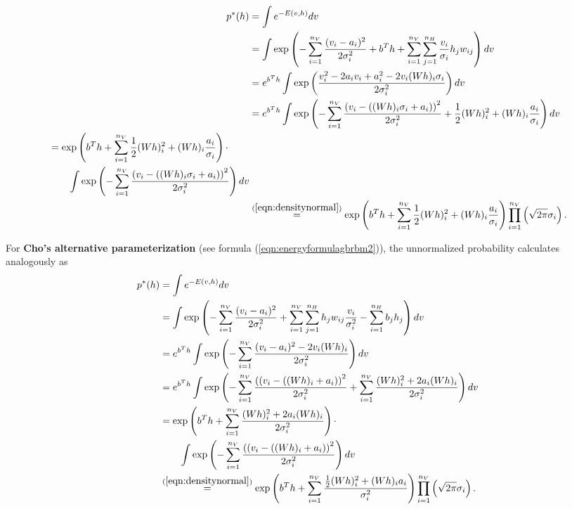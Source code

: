 \documentclass[12pt]{article}
\begin{document}
\begin{align*}
   p^*(h) &= \int e^{-E \left(v,h \right)} dv \\
   &= \int \exp \left( -\sum_{i=1}^{n_V}\frac{(v_i - a_i)^2}{2\sigma_i^2} + b^T h + \sum_{i=1}^{n_V} \sum_{j=1}^{n_H} \frac{v_i}{\sigma_i}h_j w_{ij} \right) dv\\
   &= e^{b^T h} \int \exp \left( \frac{v_i^2 -2 a_i v_i + a_i^2 - 2 v_i (Wh)_i \sigma_i}{2 \sigma_i^2} \right) dv \\
   &= e^{b^T h} \int \exp \left(
      - \sum_{i=1}^{n_V} \frac{{\left( v_i - \left( (Wh)_i \sigma_i + a_i \right) \right)}^2}{2\sigma_i^2} + \frac{1}{2}(Wh)_i^2 + (Wh)_i \frac{a_i}{\sigma_i} \right ) dv \\
   \begin{split}
      &= \exp \left(b^T h + \sum_{i=1}^{n_V} \frac{1}{2}(Wh)_i^2 + (Wh)_i \frac{a_i}{\sigma_i} \right ) \cdot \\
      & \quad \quad \int \exp \left ( - \sum_{i=1}^{n_V} \frac{{\left( v_i - ((Wh)_i \sigma_i + a_i) \right)}^2}{2\sigma_i^2} \right) dv
   \end{split} \\
   & \stackrel{(\ref{eqn:densitynormal})}{=} \exp \left( b^T h + \sum_{i=1}^{n_V} \frac{1}{2}(Wh)_i^2 + (Wh)_i \frac{a_i}{\sigma_i} \right ) \prod_{i=1}^{n_V}\left(\sqrt{2\pi} \sigma_i\right). \\
\end{align*}

For {\bf Cho's alternative parameterization} (see formula (\ref{eqn:energyformulagbrbm2})), the unnormalized probability calculates analogously as
\begin{align*}
   p^*(h) &= \int e^{-E \left(v,h \right)} dv \\
   &= \int \exp \left( - \sum_{i=1}^{n_V} \frac{(v_i - a_i)^2}{2\sigma_i^2} + \sum_{i=1}^{n_V} \sum_{j=1}^{n_H} h_j w_{ij} \frac{v_i}{\sigma_i^2} - \sum_{i=1}^{n_H} b_j h_j \right) dv \\
   &= e^{b^T h} \int \exp\left( - \sum_{i=1}^{n_V} \frac{(v_i - a_i)^2 - 2 v_i (Wh)_i}{2 \sigma_i^2} \right) dv \\
   &= e^{b^T h} \int \exp \left( - \sum_{i=1}^{n_V} \frac{\left((v_i - ((Wh)_i + a_i) \right)^2}{2 \sigma_i^2}  + \sum_{i=1}^{n_V} \frac{(Wh)_i^2 + 2 a_i (Wh)_i}{2\sigma_i^2} \right) dv\\
   &= \exp \left( b^T h + \sum_{i=1}^{n_V} \frac{(Wh)_i^2 + 2 a_i (Wh)_i}{2\sigma_i^2} \right) \cdot \\
   & \quad \quad \int \exp \left(- \sum_{i=1}^{n_V} \frac{\left((v_i - ((Wh)_i + a_i) \right)^2}{2 \sigma_i^2} \right) dv\\
   &\stackrel{(\ref{eqn:densitynormal})}{=} \exp \left( b^T h + \sum_{i=1}^{n_V} \frac{\frac{1}{2}(Wh)_i^2 + (Wh)_i a_i}{\sigma_i^2} \right ) \prod_{i=1}^{n_V}\left(\sqrt{2\pi} \sigma_i \right).
\end{align*}
\end{document}
